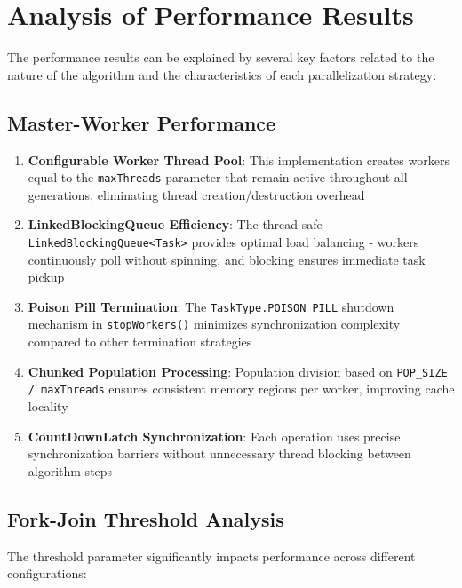 \newpage

\section{Analysis of Performance Results}

The performance results can be explained by several key factors related to the nature of the algorithm and the characteristics of each parallelization strategy:

\subsection{Master-Worker Performance}

\begin{enumerate}
   \item \textbf{Configurable Worker Thread Pool}: This implementation creates workers equal to the \texttt{maxThreads} parameter that remain active throughout all generations, eliminating thread creation/destruction overhead
   \item \textbf{LinkedBlockingQueue Efficiency}: The thread-safe \texttt{LinkedBlockingQueue<Task>} provides optimal load balancing - workers continuously poll without spinning, and blocking ensures immediate task pickup
   \item \textbf{Poison Pill Termination}: The \texttt{TaskType.POISON\_PILL} shutdown mechanism in \texttt{stopWorkers()} minimizes synchronization complexity compared to other termination strategies
   \item \textbf{Chunked Population Processing}: Population division based on \texttt{POP\_SIZE / maxThreads} ensures consistent memory regions per worker, improving cache locality
   \item \textbf{CountDownLatch Synchronization}: Each operation uses precise synchronization barriers without unnecessary thread blocking between algorithm steps
\end{enumerate}

\newpage

\subsection{Fork-Join Threshold Analysis}

The threshold parameter significantly impacts performance across different configurations:

